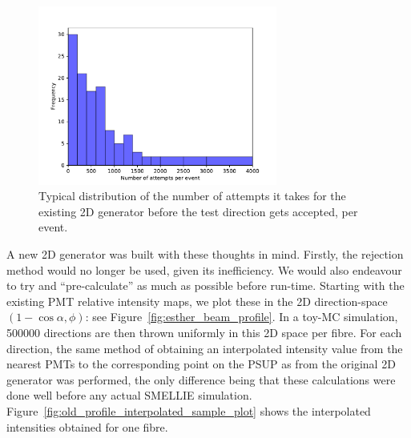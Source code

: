 \begin{figure}
    \centering
    \includegraphics[width=0.7\textwidth]{5_SMELLIESimulation/images/2D_generator_num_attempts_nicer.pdf}
    \caption{Typical distribution of the number of attempts it takes for the existing 2D generator before the test direction gets accepted, per event.}
    \label{fig:num_attempts}
\end{figure}

A new 2D generator was built with these thoughts in mind. Firstly, the rejection method would no longer be used, given its inefficiency. We would also endeavour to try and ``pre-calculate'' as much as possible before run-time. Starting with the existing PMT relative intensity maps, we plot these in the 2D direction-space $(1-\cos\alpha, \phi)$: see Figure~\ref{fig:esther_beam_profile}. In a toy-MC simulation, \num{500000} directions are then thrown uniformly in this 2D space per fibre. For each direction, the same method of obtaining an interpolated intensity value from the nearest PMTs to the corresponding point on the PSUP as from the original 2D generator was performed, the only difference being that these calculations were done well before any actual SMELLIE simulation. Figure~\ref{fig:old_profile_interpolated_sample_plot} shows the interpolated intensities obtained for one fibre.

